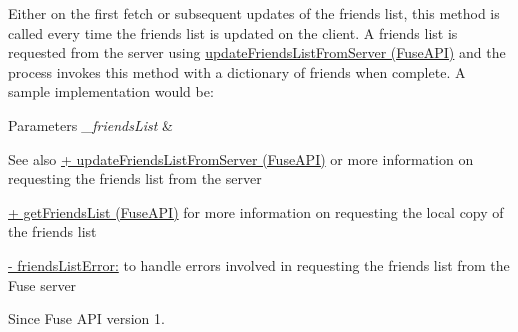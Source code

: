 Either on the first fetch or subsequent updates of the friends list, this method is called every time the friends list is updated on the client. A friends list is requested from the server using \hyperlink{interface_fuse_a_p_i_a11a92658dca5be9d79ca19a66bafb91e}{update\+Friends\+List\+From\+Server (\+Fuse\+A\+P\+I)} and the process invokes this method with a dictionary of friends when complete. A sample implementation would be\+:





\begin{DoxyParams}{Parameters}
{\em \+\_\+friends\+List} & \\
\hline
\end{DoxyParams}
\begin{DoxySeeAlso}{See also}
\hyperlink{interface_fuse_a_p_i_a11a92658dca5be9d79ca19a66bafb91e}{+ update\+Friends\+List\+From\+Server (\+Fuse\+A\+P\+I)} or more information on requesting the friends list from the server 

\hyperlink{interface_fuse_a_p_i_a31d609ce39be3e6eda04fd32d8036e95}{+ get\+Friends\+List (\+Fuse\+A\+P\+I)} for more information on requesting the local copy of the friends list 

\hyperlink{protocol_fuse_delegate-p_ae3f6e6108bdf165e61c77bed22f10a1f}{-\/ friends\+List\+Error\+:} to handle errors involved in requesting the friends list from the Fuse server 
\end{DoxySeeAlso}
\begin{DoxySince}{Since}
Fuse A\+P\+I version 1. 
\end{DoxySince}
\hypertarget{protocol_fuse_delegate-p_ac775d9f5c31ecd49516f807847f408d7}{}
